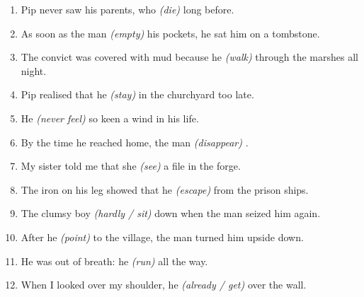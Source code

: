 \documentclass{fiche}
\begin{document}
\entete





\begin{anglais}
\begin{enumerate}[label=\arabic*.,itemsep=2.2mm,leftmargin=*]
  \item Pip never saw his parents, who \emph{(die)}  long before.
  \item As soon as the man \emph{(empty)}  his pockets, he sat him on a
    tombstone.
  \item The convict was covered with mud because he \emph{(walk)}  through
    the marshes all night.
  \item Pip realised that he \emph{(stay)}  in the churchyard too late.
  \item He \emph{(never feel)}  so keen a wind in his life.
  \item By the time he reached home, the man \emph{(disappear)} .
  \item My sister told me that she \emph{(see)}  a file in the forge.
  \item The iron on his leg showed that he \emph{(escape)}  from the
    prison ships.
  \item The clumsy boy \emph{(hardly / sit)}  down when the man seized
    him again.
  \item After he \emph{(point)}  to the village, the man turned him upside
    down.
  \item He was out of breath: he \emph{(run)}  all the way.
  \item When I looked over my shoulder, he \emph{(already / get)}  over
    the wall.
\end{enumerate}
\end{anglais}
\end{document}
